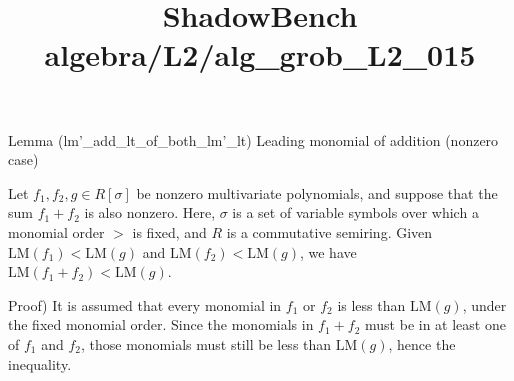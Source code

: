 \documentclass{article}
\title{ShadowBench algebra/L2/alg\_grob\_L2\_015}
\begin{document}
\maketitle

Lemma (lm'_add_lt_of_both_lm'_lt)
Leading monomial of addition (nonzero case)

Let $f_1, f_2, g \in R[\sigma]$ be nonzero multivariate polynomials, and suppose that the sum $f_1 + f_2$ is also nonzero. Here, $\sigma$ is a set of variable symbols over which a monomial order $>$ is fixed, and $R$ is a commutative semiring. Given $\mathrm{LM}(f_1) < \mathrm{LM}(g)$ and $\mathrm{LM}(f_2) < \mathrm{LM}(g)$, we have $\mathrm{LM}(f_1 + f_2) < \mathrm{LM}(g)$.

Proof)
It is assumed that every monomial in $f_1$ or $f_2$ is less than $\mathrm{LM}(g)$, under the fixed monomial order. Since the monomials in $f_1 + f_2$ must be in at least one of $f_1$ and $f_2$, those monomials must still be less than $\mathrm{LM}(g)$, hence the inequality.
\end{document}
